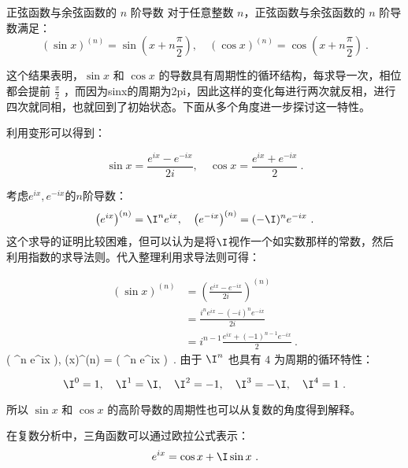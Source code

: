 \begin{corollary}{正弦函数与余弦函数的 $n$ 阶导数}
对于任意整数 $n$，正弦函数与余弦函数的 $n$ 阶导数满足：
\begin{equation}
(\sin x)^{(n)} = \sin\left(x + n\frac{\pi}{2}\right), \quad
(\cos x)^{(n)} = \cos\left(x + n\frac{\pi}{2}\right)~.
\end{equation}
\end{corollary}

这个结果表明，$\sin x$ 和 $\cos x$ 的导数具有周期性的循环结构，每求导一次，相位都会提前 $\frac{\pi}{2}$ ，而因为sinx的周期为2pi，因此这样的变化每进行两次就反相，进行四次就同相，也就回到了初始状态。下面从多个角度进一步探讨这一特性。

利用变形可以得到：

\begin{equation}
\sin x = \frac{e^{ix} - e^{-ix}}{2i}, \quad \cos x = \frac{e^{ix} + e^{-ix}}{2}~.
\end{equation}

考虑$e^{ix},e^{-ix}$的$n$阶导数：
\begin{equation}
\left(e^{ix}\right)^{(n)} = \I^n e^{ix},\quad\left(e^{-ix}\right)^{(n)} = (-\I)^n e^{-ix}~.
\end{equation}
这个求导的证明比较困难，但可以认为是将$\I$视作一个如实数那样的常数，然后利用指数的求导法则。代入整理利用求导法则可得：

\begin{equation}
\begin{split}
\left( \sin x \right)^{(n)} &= \left( \frac{e^{ix} - e^{-ix}}{2i} \right)^{(n)}\\
&=\frac{i^n e^{ix} - (-i)^n e^{-ix}}{2i}\\
&=i^{n-1} \frac{e^{ix} + (-1)^{n-1} e^{-ix}}{2}~.
\end{split}
\end{equation}
 \left( \I^n e^{ix} \right), \quad
(\cos x)^{(n)} =  \left( \I^n e^{ix} \right)~.
由于 $\I^n$ 也具有 $4$ 为周期的循环特性：

\begin{equation}
\I^0 = 1, \quad \I^1 = \I, \quad \I^2 = -1, \quad \I^3 = -\I, \quad \I^4 = 1~.
\end{equation}

所以 $\sin x$ 和 $\cos x$ 的高阶导数的周期性也可以从复数的角度得到解释。

在复数分析中，三角函数可以通过欧拉公式表示：
\begin{equation}
e^{ix} = \cos x + \I\sin x~.
\end{equation}

